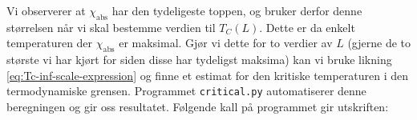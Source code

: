 \documentclass[11pt]{article}
\begin{document}
Vi observerer at $\chi_\text{abs}$ har den tydeligeste toppen, og
bruker derfor denne størrelsen når vi skal bestemme verdien til
$T_C(L)$. Dette er da enkelt temperaturen der $\chi_\text{abs}$ er
maksimal. Gjør vi dette for to verdier av $L$ (gjerne de to største vi
har kjørt for siden disse har tydeligst maksima) kan vi bruke likning
\eqref{eq:Tc-inf-scale-expression} og finne et estimat for den
kritiske temperaturen i den termodynamiske grensen. Programmet
\texttt{critical.py} automatiserer denne beregningen og gir oss
resultatet. Følgende kall på programmet gir utskriften:

\clearpage
\printbibliography
\end{document}
